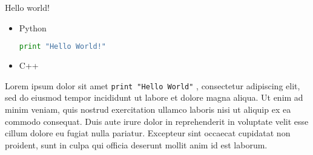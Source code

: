 \documentclass[a4paper]{article}
\begin{document}
Hello world!

\begin{itemize}
 \item Python
  \begin{lstlisting}[language=Python]
  print "Hello World!"
  \end{lstlisting}

 \item C++
  
\end{itemize}
Lorem ipsum dolor sit amet \lstinline{print "Hello World"} , consectetur adipiscing elit, sed do eiusmod tempor incididunt ut labore et dolore magna aliqua. Ut enim ad minim veniam, quis nostrud exercitation ullamco laboris nisi ut aliquip ex ea commodo consequat. Duis aute irure dolor in reprehenderit in voluptate velit esse cillum dolore eu fugiat nulla pariatur. Excepteur sint occaecat cupidatat non proident, sunt in culpa qui officia deserunt mollit anim id est laborum.
\end{document}
